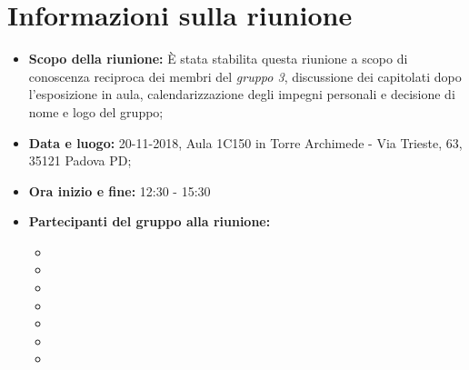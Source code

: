 \clearpage
\section{Informazioni sulla riunione}
\begin{itemize}
	\item \textbf {Scopo della riunione:} È stata stabilita questa riunione a scopo di conoscenza reciproca dei membri del \emph{gruppo 3}, discussione dei capitolati  dopo l’esposizione in aula, calendarizzazione degli impegni personali e decisione di nome e logo del gruppo;
	
	\item \textbf {Data e luogo:} 20-11-2018, Aula 1C150 in Torre Archimede - Via Trieste, 63, 35121 Padova PD;
	
	\item \textbf {Ora inizio e fine:} 12:30 - 15:30
	
	\item \textbf {Partecipanti del gruppo alla riunione:} 
		 \begin{itemize}
			\item \sonia
			\item \luca
			\item \matteo
			\item \pardeep
			\item \alberto
			\item \alessandro
			\item \andrea
		\end{itemize}
\end{itemize}